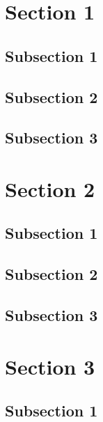 \documentclass{beamer}
\begin{document}
    {
    \begin{frame}
        \titlepage
    \end{frame}}

    \section{Section 1}

    \subsection{Subsection 1}
    \frame{}
    \frame{}

    \subsection{Subsection 2}
    \frame{}
    \frame{}

    \subsection{Subsection 3}
    \frame{}
    \frame{}
    \frame{}

    \section{Section 2}

    \subsection{Subsection 1}
    \frame{}
    \frame{}

    \subsection{Subsection 2}
    \frame{}
    \frame{}

    \subsection{Subsection 3}
    \frame{}
    \frame{}
    \frame{}

    \section{Section 3}

    \subsection{Subsection 1}
    \frame{}
    \frame{}
\end{document}
